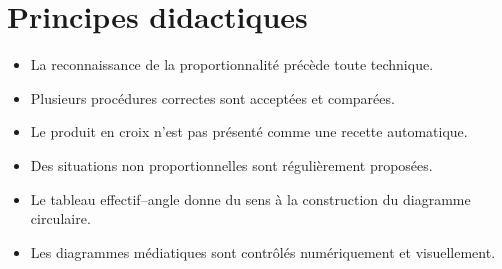 \documentclass[12pt,a4paper]{article}
\begin{document}
\section*{Principes didactiques}

\begin{itemize}
  \item La reconnaissance de la proportionnalité précède toute technique.
  \item Plusieurs procédures correctes sont acceptées et comparées.
  \item Le produit en croix n'est pas présenté comme une recette automatique.
  \item Des situations non proportionnelles sont régulièrement proposées.
  \item Le tableau effectif--angle donne du sens à la construction du diagramme circulaire.
  \item Les diagrammes médiatiques sont contrôlés numériquement et visuellement.
\end{itemize}
\end{document}
